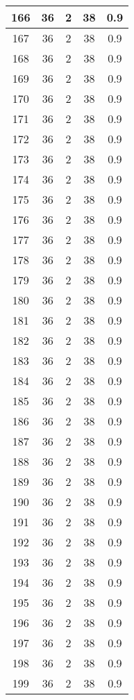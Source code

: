 \documentclass[letterpaper, 12pt]{article}
\begin{document}
\begin{longtable}{|c|c|c|c|c|}
\hline
166 & 36 & 2 & 38 & 0.9 \\
\hline
167 & 36 & 2 & 38 & 0.9 \\
\hline
168 & 36 & 2 & 38 & 0.9 \\
\hline
169 & 36 & 2 & 38 & 0.9 \\
\hline
170 & 36 & 2 & 38 & 0.9 \\
\hline
171 & 36 & 2 & 38 & 0.9 \\
\hline
172 & 36 & 2 & 38 & 0.9 \\
\hline
173 & 36 & 2 & 38 & 0.9 \\
\hline
174 & 36 & 2 & 38 & 0.9 \\
\hline
175 & 36 & 2 & 38 & 0.9 \\
\hline
176 & 36 & 2 & 38 & 0.9 \\
\hline
177 & 36 & 2 & 38 & 0.9 \\
\hline
178 & 36 & 2 & 38 & 0.9 \\
\hline
179 & 36 & 2 & 38 & 0.9 \\
\hline
180 & 36 & 2 & 38 & 0.9 \\
\hline
181 & 36 & 2 & 38 & 0.9 \\
\hline
182 & 36 & 2 & 38 & 0.9 \\
\hline
183 & 36 & 2 & 38 & 0.9 \\
\hline
184 & 36 & 2 & 38 & 0.9 \\
\hline
185 & 36 & 2 & 38 & 0.9 \\
\hline
186 & 36 & 2 & 38 & 0.9 \\
\hline
187 & 36 & 2 & 38 & 0.9 \\
\hline
188 & 36 & 2 & 38 & 0.9 \\
\hline
189 & 36 & 2 & 38 & 0.9 \\
\hline
190 & 36 & 2 & 38 & 0.9 \\
\hline
191 & 36 & 2 & 38 & 0.9 \\
\hline
192 & 36 & 2 & 38 & 0.9 \\
\hline
193 & 36 & 2 & 38 & 0.9 \\
\hline
194 & 36 & 2 & 38 & 0.9 \\
\hline
195 & 36 & 2 & 38 & 0.9 \\
\hline
196 & 36 & 2 & 38 & 0.9 \\
\hline
197 & 36 & 2 & 38 & 0.9 \\
\hline
198 & 36 & 2 & 38 & 0.9 \\
\hline
199 & 36 & 2 & 38 & 0.9 \\
\hline
\end{longtable}
\end{document}
